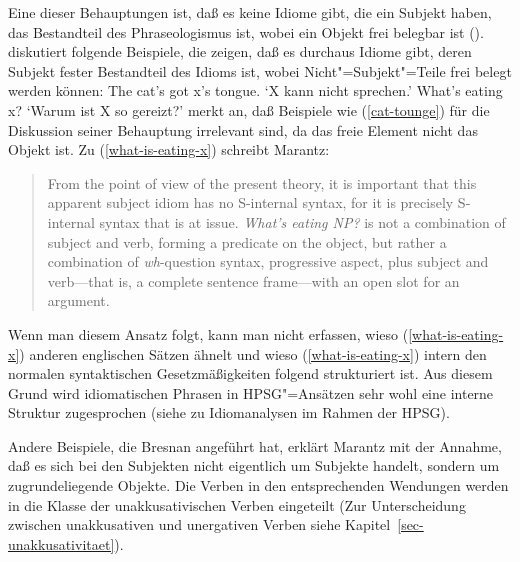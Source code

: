 
%
Eine dieser Behauptungen ist, daß es keine Idiome gibt, die ein Subjekt haben, das Bestandteil des
Phraseologismus ist, wobei ein Objekt frei belegbar ist (\citealp[--51]{Marantz81a-u}).
\citet[--350]{Bresnan82c} diskutiert folgende Beispiele, die zeigen, daß es durchaus
Idiome gibt, deren Subjekt fester Bestandteil des Idioms ist, wobei Nicht"=Subjekt"=Teile
frei belegt werden können:
\eal
\ex\label{cat-tounge}
The cat's got x's tongue.
\glt `X kann nicht sprechen.'
\ex\label{what-is-eating-x}
What's eating x?
\glt `Warum ist X so gereizt?'
\zl
\citet[]{Marantz84a} merkt an, daß Beispiele wie (\ref{cat-tounge}) für die Diskussion seiner
Behauptung irrelevant sind, da das freie Element nicht das Objekt ist. Zu (\ref{what-is-eating-x}) schreibt
Marantz:
\begin{quote}
From the point of view of the present theory, it is important that this apparent subject idiom
has no S-internal syntax, for it is precisely S-internal syntax that is at issue. \emph{What's eating NP?}
is not a combination of subject and verb, forming a predicate on the object, but rather a combination of \emph{wh}-question
syntax, progressive aspect, plus subject and verb---that is, a complete sentence frame---with an open slot
for an argument. \citep[]{Marantz84a}
\end{quote}
Wenn man diesem Ansatz folgt, kann man nicht erfassen, wieso (\ref{what-is-eating-x}) anderen englischen
Sätzen ähnelt und wieso (\ref{what-is-eating-x}) intern den normalen syntaktischen Gesetzmäßigkeiten folgend strukturiert ist.
Aus diesem Grund wird idiomatischen Phrasen in HPSG"=Ansätzen sehr wohl eine interne Struktur zugesprochen 
(siehe  zu Idiomanalysen im Rahmen der HPSG). 

Andere Beispiele, die Bresnan angeführt hat, erklärt Marantz mit der Annahme, daß es sich bei
den Subjekten nicht eigentlich um Subjekte handelt, sondern um zugrundeliegende Objekte. Die
Verben in den entsprechenden Wendungen werden in die Klasse der unakkusativischen Verben eingeteilt
(Zur Unterscheidung zwischen unakkusativen und unergativen Verben siehe Kapitel~\ref{sec-unakkusativitaet}).

